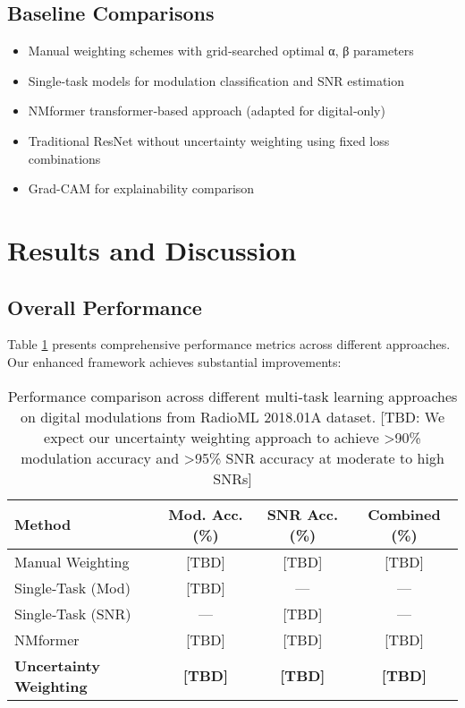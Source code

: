 \documentclass{ELSP}
\begin{document}
\subsection{Baseline Comparisons}
\begin{itemize}
\item Manual weighting schemes with grid‑searched optimal α, β parameters
\item Single‑task models for modulation classification and SNR estimation
\item NMformer transformer‑based approach \cite{faysal2024nmformer} (adapted for digital‑only)
\item Traditional ResNet without uncertainty weighting using fixed loss combinations
\item Grad-CAM \cite{selvaraju2017grad} for explainability comparison
\end{itemize}

\section{Results and Discussion}

\subsection{Overall Performance}

Table \ref{tab:performance} presents comprehensive performance metrics across different approaches. Our enhanced framework achieves substantial improvements:

\begin{table}[H]
\centering
\begin{tabular}{lccc}
\toprule
\textbf{Method} & \textbf{Mod. Acc. (\%)} & \textbf{SNR Acc. (\%)} & \textbf{Combined (\%)} \\
\midrule
Manual Weighting & [TBD] & [TBD] & [TBD] \\
Single‑Task (Mod) & [TBD] & — & — \\
Single‑Task (SNR) & — & [TBD] & — \\
NMformer \cite{faysal2024nmformer} & [TBD] & [TBD] & [TBD] \\
\textbf{Uncertainty Weighting} & \textbf{[TBD]} & \textbf{[TBD]} & \textbf{[TBD]} \\
\bottomrule
\end{tabular}
\caption{Performance comparison across different multi‑task learning approaches on digital modulations from RadioML 2018.01A dataset. [TBD: We expect our uncertainty weighting approach to achieve >90\% modulation accuracy and >95\% SNR accuracy at moderate to high SNRs]}
\label{tab:performance}
\end{table}
\end{document}
